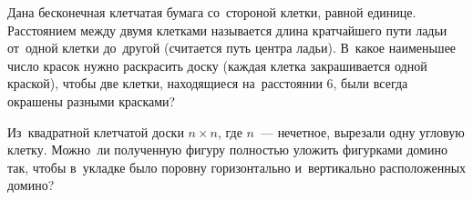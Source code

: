 \begin{problems}
\item
Дана бесконечная клетчатая бумага со~стороной клетки, равной единице.
Расстоянием между двумя клетками называется длина кратчайшего пути ладьи
от~одной клетки до~другой (считается путь центра ладьи).
В~какое наименьшее число красок нужно раскрасить доску (каждая клетка
закрашивается одной краской), чтобы две клетки, находящиеся на~расстоянии 6,
были всегда окрашены разными красками?

\item
Из~квадратной клетчатой доски $n \times n$, где $n$~--- нечетное, вырезали
одну угловую клетку.
Можно~ли полученную фигуру полностью уложить фигурками домино так, чтобы
в~укладке было поровну горизонтально и~вертикально расположенных домино?

\end{problems}

